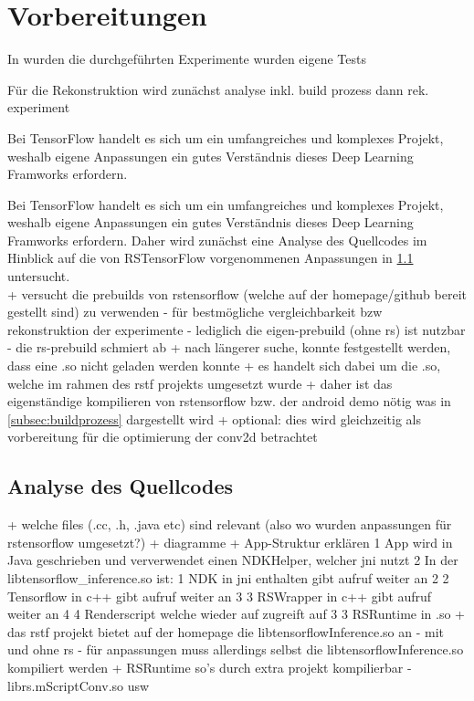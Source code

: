 \section{Vorbereitungen}
\label{sec:vorbereitungen}
In \cite{rstensorflow2017} wurden die durchgeführten Experimente wurden eigene Tests 


Für die Rekonstruktion wird zunächst analyse inkl. build prozess dann rek. experiment

Bei TensorFlow handelt es sich um ein umfangreiches und komplexes Projekt, weshalb eigene Anpassungen ein gutes Verständnis dieses Deep Learning Framworks erfordern. 

Bei TensorFlow handelt es sich um ein umfangreiches und komplexes Projekt, weshalb eigene Anpassungen ein gutes Verständnis dieses Deep Learning Framworks erfordern. Daher wird zunächst eine Analyse des Quellcodes im Hinblick auf die von RSTensorFlow vorgenommenen Anpassungen in \ref{subsec:quellcodeanalyse} untersucht. 
\\

+ versucht die prebuilds von rstensorflow (welche auf der homepage/github bereit gestellt sind) zu verwenden
	- für bestmögliche vergleichbarkeit bzw rekonstruktion der experimente
	- lediglich die eigen-prebuild (ohne rs) ist nutzbar
	- die rs-prebuild schmiert ab
+ nach längerer suche, konnte festgestellt werden, dass eine .so nicht geladen werden konnte
+ es handelt sich dabei um die .so, welche im rahmen des rstf projekts umgesetzt wurde
+ daher ist das eigenständige kompilieren von rstensorflow bzw. der android demo nötig was in \ref{subsec:buildprozess} dargestellt wird
+ optional: dies wird gleichzeitig als vorbereitung für die optimierung der conv2d betrachtet



\subsection{Analyse des Quellcodes}
\label{subsec:quellcodeanalyse}
+ welche files (.cc, .h, .java etc) sind relevant (also wo wurden anpassungen für rstensorflow umgesetzt?)
+ diagramme		
+ App-Struktur erklären 
	1 App wird in Java geschrieben und ververwendet einen NDKHelper, welcher jni nutzt
	2 In der libtensorflow\_inference.so ist:
		1 NDK in jni enthalten gibt aufruf weiter an 2
		2 Tensorflow in c++ gibt aufruf weiter an 3 
		3 RSWrapper in c++ gibt aufruf weiter an 4
		4 Renderscript welche wieder auf zugreift auf 3
	3 RSRuntime in .so 
+ das rstf projekt bietet auf der homepage die libtensorflowInference.so an - mit und ohne rs
	- für anpassungen muss allerdings selbst die libtensorflowInference.so kompiliert werden
+ RSRuntime so's durch extra projekt kompilierbar
	- librs.mScriptConv.so usw 
	

